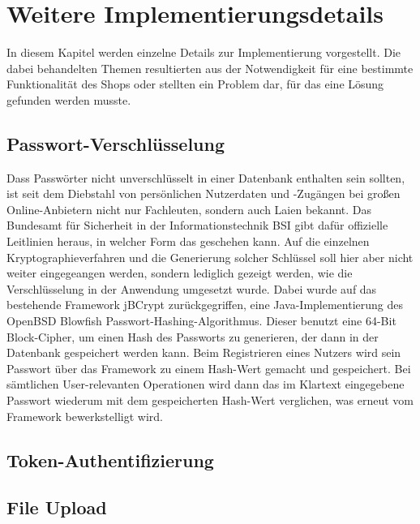 \section{Weitere Implementierungsdetails} \thispagestyle{nomarkstyle}
In diesem Kapitel werden einzelne Details zur Implementierung vorgestellt.
Die dabei behandelten Themen resultierten aus der Notwendigkeit für eine bestimmte Funktionalität des Shops oder stellten ein Problem dar, für das eine Lösung gefunden werden musste.
\subsection{Passwort-Verschlüsselung}
Dass Passwörter nicht unverschlüsselt in einer Datenbank enthalten sein sollten, ist seit dem Diebstahl von persönlichen Nutzerdaten und -Zugängen bei großen Online-Anbietern nicht nur Fachleuten, sondern auch Laien bekannt.
Das Bundesamt für Sicherheit in der Informationstechnik \acs{BSI} gibt dafür offizielle Leitlinien heraus, in welcher Form das geschehen kann\cite{BSI2016}. 
Auf die einzelnen Kryptographieverfahren und die Generierung solcher Schlüssel soll hier aber nicht weiter eingegeangen werden, sondern lediglich gezeigt werden, wie die Verschlüsselung in der Anwendung umgesetzt wurde.
Dabei wurde auf das bestehende Framework jBCrypt zurückgegriffen, eine Java-Implementierung des OpenBSD Blowfish Passwort-Hashing-Algorithmus\cite{jBCrypt2015}. 
Dieser benutzt eine 64-Bit Block-Cipher, um einen Hash des Passworts zu generieren, der dann in der Datenbank gespeichert werden kann\cite{Provos}. 
Beim Registrieren eines Nutzers wird sein Passwort über das Framework zu einem Hash-Wert gemacht und gespeichert.
Bei sämtlichen User-relevanten Operationen wird dann das im Klartext eingegebene Passwort wiederum mit dem gespeicherten Hash-Wert verglichen, was erneut vom Framework bewerkstelligt wird.
\subsection{Token-Authentifizierung}

\subsection{File Upload}
